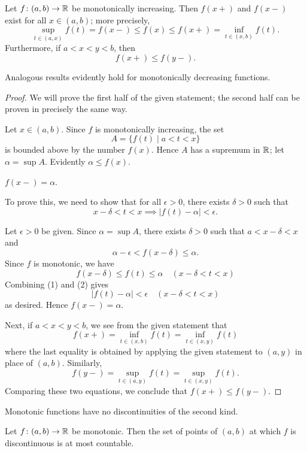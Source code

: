 \begin{proposition}
Let $f\colon (a,b)\to\mathbb R$ be monotonically increasing. Then $f(x+)$ and $f(x-)$ exist for all $x\in(a,b)$; more precisely,
\[\sup_{t\in(a,x)}f(t)=f(x-)\le f(x)\le f(x+)=\inf_{t\in(x,b)}f(t).\]
Furthermore, if $a<x<y<b$, then
\[f(x+)\le f(y-).\]
\end{proposition}

Analogous results evidently hold for monotonically decreasing functions.

\begin{proof}
We will prove the first half of the given statement; the second half can be proven in precisely the same way.

Let $x\in(a,b)$. Since $f$ is monotonically increasing, the set
\[A=\{f(t)\mid a<t<x\}\]
is bounded above by the number $f(x)$. Hence $A$ has a supremum in $\mathbb R$; let $\alpha=\sup A$. Evidently $\alpha\le f(x)$.
\begin{claim}
$f(x-)=\alpha$.
\end{claim}
To prove this, we need to show that for all $\epsilon>0$, there exists $\delta>0$ such that
\[x-\delta<t<x\implies |f(t)-\alpha|<\epsilon.\]

Let $\epsilon>0$ be given. Since $\alpha=\sup A$, there exists $\delta>0$ such that $a<x-\delta<x$ and
\begin{equation*}\tag{1}
\alpha-\epsilon<f(x-\delta)\le \alpha.
\end{equation*}
Since $f$ is monotonic, we have
\begin{equation*}\tag{2}
f(x-\delta)\le f(t)\le \alpha\quad(x-\delta<t<x)
\end{equation*}
Combining (1) and (2) gives
\[|f(t)-\alpha|<\epsilon\quad(x-\delta<t<x)\]
as desired. Hence $f(x-)=\alpha$.

Next, if $a<x<y<b$, we see from the given statement that
\[f(x+)=\inf_{t\in(x,b)}f(t)=\inf_{t\in(x,y)}f(t)\]
where the last equality is obtained by applying the given statement to $(a,y)$ in place of $(a,b)$. Similarly,
\[f(y-)=\sup_{t\in(a,y)}f(t)=\sup_{t\in(x,y)}f(t).\]
Comparing these two equations, we conclude that $f(x+)\le f(y-)$.
\end{proof}

\begin{corollary}
Monotonic functions have no discontinuities of the second kind.
\end{corollary}

\begin{proposition}
Let $f\colon (a,b)\to\mathbb R$ be monotonic. Then the set of points of $(a,b)$ at which $f$ is discontinuous is at most countable.
\end{proposition}

